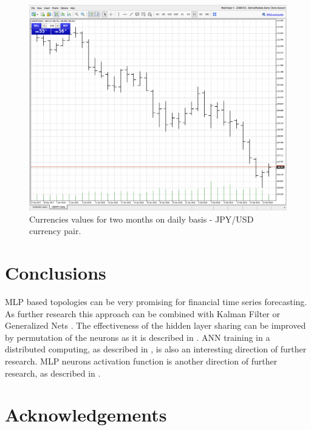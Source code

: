 \documentclass{llncs}
\begin{document}
\begin{figure}
  \includegraphics[width=1.0\linewidth]{fig03}
  \caption{Currencies values for two months on daily basis - JPY/USD currency pair.}
  \label{fig03}
\end{figure}
\FloatBarrier

\section{Conclusions} \label{Conclusions}

MLP based topologies can be very promising for financial time series forecasting. As further research this approach can be combined with Kalman Filter \cite{alexandrov01} or Generalized Nets \cite{tashev01,tashev02}. The effectiveness of the hidden layer sharing can be improved by permutation of the neurons as it is described in \cite{zankinski02}. ANN training in a distributed computing, as described in \cite{balabanov01,balabanov02,balabanov03,balabanov04,keremedchiev01,tomov01}, is also an interesting direction of further research. MLP neurons activation function is another direction of further research, as described in \cite{zankinski01}.


\section*{Acknowledgements}
\end{document}
